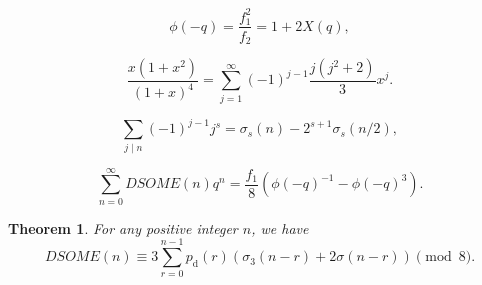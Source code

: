 \documentclass[10pt,a4paper]{amsart}
\newtheorem{theorem}{Theorem}
\begin{document}
\begin{equation}\label{DSE3}
\phi(-q)=\dfrac{f_1^2}{f_2}
=1+2X(q),
\end{equation}

    \begin{equation}\label{DSM8M17}
\dfrac{x(1+x^2)}{(1+x)^4}
=
\sum_{j=1}^{\infty}
(-1)^{j-1}
\dfrac{j(j^2+2)}{3}x^j.
    \end{equation}

   \begin{equation}\label{DSM8M20}
       \sum_{j\mid n}(-1)^{j-1}j^s=
\sigma_s(n)-2^{s+1}\sigma_s(n/2),
   \end{equation}

\begin{equation}\label{DSE2}
\sum_{n=0}^{\infty}DSOME(n)q^n
=
\dfrac{f_1}{8}
\left(
\phi(-q)^{-1}-\phi(-q)^3
\right).
\end{equation}

\begin{theorem}\label{DSM8THM}
 For any positive integer $n$, we have
\begin{equation*}
DSOME(n)
\equiv
3\sum_{r=0}^{n-1}
p_{\mathrm d}(r)
\left(
\sigma_3(n-r)+2\sigma(n-r)
\right)
\pmod 8.
\end{equation*}
\end{theorem}
\end{document}
